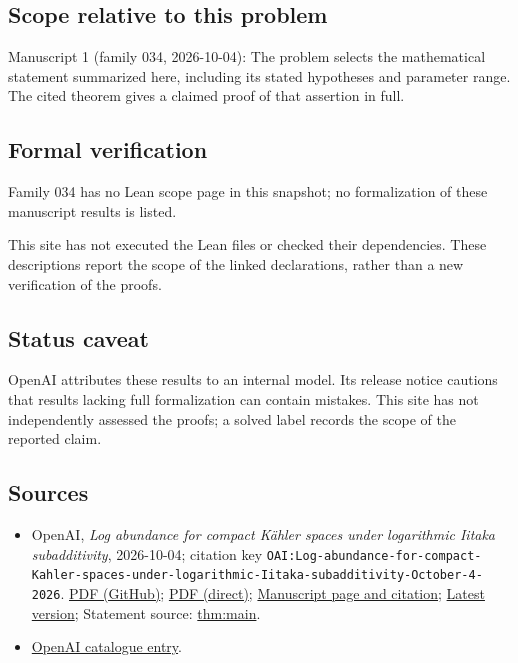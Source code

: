 \documentclass[11pt]{article}
\begin{document}
\subsection{Scope relative to this problem}
Manuscript 1 (family 034, 2026-10-04): The problem selects the mathematical statement summarized here, including its stated hypotheses and parameter range. The cited theorem gives a claimed proof of that assertion in full.

\subsection{Formal verification}
Family 034 has no Lean scope page in this snapshot; no formalization of these manuscript results is listed.

This site has not executed the Lean files or checked their dependencies. These descriptions report the scope of the linked declarations, rather than a new verification of the proofs.

\subsection{Status caveat}
OpenAI attributes these results to an internal model. Its release notice cautions that results lacking full formalization can contain mistakes. This site has not independently assessed the proofs; a solved label records the scope of the reported claim.

\subsection{Sources}
\begin{itemize}
\item OpenAI, \emph{Log abundance for compact Kähler spaces under logarithmic Iitaka subadditivity}, 2026-10-04; citation key \texttt{OAI:Log-abundance-for-compact-Kahler-spaces-under-logarithmic-Iitaka-subadditivity-October-4-2026}. \href{https://github.com/openai/math/blob/adc7f1241b42e322a6451854ab7e4b4c146bf78a/preprints/Log-abundance-for-compact-Kahler-spaces-under-logarithmic-Iitaka-subadditivity-October-4-2026/main.pdf}{PDF (GitHub)}; \href{https://github.com/openai/math/raw/adc7f1241b42e322a6451854ab7e4b4c146bf78a/preprints/Log-abundance-for-compact-Kahler-spaces-under-logarithmic-Iitaka-subadditivity-October-4-2026/main.pdf}{PDF (direct)}; \href{https://github.com/openai/math/blob/adc7f1241b42e322a6451854ab7e4b4c146bf78a/preprints/Log-abundance-for-compact-Kahler-spaces-under-logarithmic-Iitaka-subadditivity-October-4-2026/README.md}{Manuscript page and citation}; \href{https://github.com/openai/math/blob/main/preprints/Log-abundance-for-compact-Kahler-spaces-under-logarithmic-Iitaka-subadditivity-October-4-2026/main.pdf}{Latest version}; Statement source: \href{https://github.com/openai/math/blob/adc7f1241b42e322a6451854ab7e4b4c146bf78a/preprints/Log-abundance-for-compact-Kahler-spaces-under-logarithmic-Iitaka-subadditivity-October-4-2026/build/sections/01-introduction.tex\#L56}{thm:main}.
\item \href{https://github.com/openai/math/blob/adc7f1241b42e322a6451854ab7e4b4c146bf78a/CONTENTS.md}{OpenAI catalogue entry}.
\end{itemize}
\end{document}
